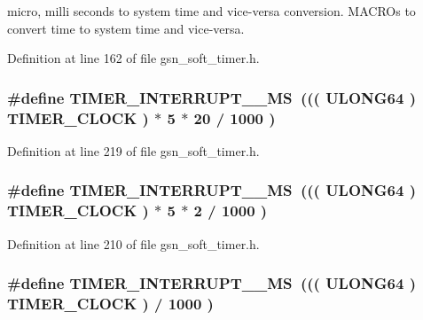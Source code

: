 micro, milli seconds to system time and vice-\/versa conversion. MACROs to convert time to system time and vice-\/versa. 



Definition at line 162 of file gsn\_\-soft\_\-timer.h.

\hypertarget{a00673_gad5a78b2ffba4f82dde6607a5cf7af659}{
\subsubsection[{TIMER\_\-INTERRUPT\_\-100\_\-MS}]{\setlength{\rightskip}{0pt plus 5cm}\#define TIMER\_\-INTERRUPT\_\_\-MS~((( {\bf ULONG64} ) TIMER\_\-CLOCK ) $\ast$ 5 $\ast$ 20 / 1000 )}}
\label{a00673_gad5a78b2ffba4f82dde6607a5cf7af659}


Definition at line 219 of file gsn\_\-soft\_\-timer.h.

\hypertarget{a00673_ga15be38412cbf707fb1713528a5f5e6b3}{
\subsubsection[{TIMER\_\-INTERRUPT\_\-10\_\-MS}]{\setlength{\rightskip}{0pt plus 5cm}\#define TIMER\_\-INTERRUPT\_\_\-MS~((( {\bf ULONG64} ) TIMER\_\-CLOCK ) $\ast$ 5 $\ast$ 2 / 1000 )}}
\label{a00673_ga15be38412cbf707fb1713528a5f5e6b3}


Definition at line 210 of file gsn\_\-soft\_\-timer.h.

\hypertarget{a00673_gad5a672b2263743c1daf0ee6797d2fbfd}{
\subsubsection[{TIMER\_\-INTERRUPT\_\-1\_\-MS}]{\setlength{\rightskip}{0pt plus 5cm}\#define TIMER\_\-INTERRUPT\_\_\-MS~((( {\bf ULONG64} ) TIMER\_\-CLOCK ) / 1000 )}}
\label{a00673_gad5a672b2263743c1daf0ee6797d2fbfd}



